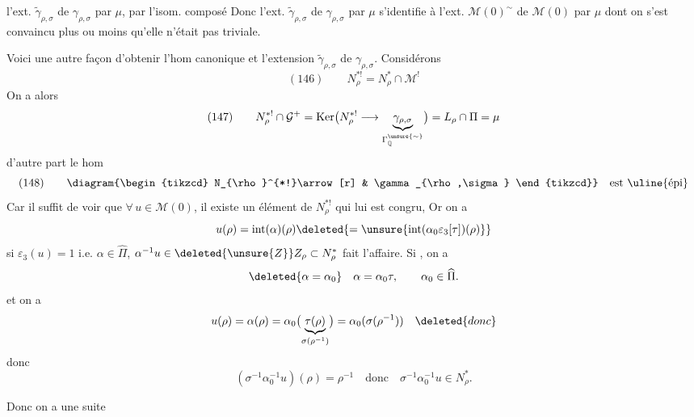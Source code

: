
l'ext. $\widetilde\gamma_{\rho,\sigma}$ de $\gamma_{\rho,\sigma}$ par $\mu$,
par l'isom. composé
Donc l'ext. $\widetilde\gamma_{\rho,\sigma}$ de $\gamma_{\rho,\sigma}$ par
$\mu$ s'identifie  à l'ext. $\mathcal M(0)^{\sim}$ de
$\mathcal M(0)$ par $\mu$ dont on s'est convaincu plus ou moins qu'elle
n'était pas triviale.

Voici une autre façon d'obtenir l'hom canonique
et l'extension $\widetilde\gamma_{\rho,\sigma}$ de $\gamma_{\rho,\sigma}$.
Considérons
\[
 (146)\qquad N_{\rho}^{*!}=N^*_{\rho}\cap\mathcal M^!
\]
On a alors
\[
 (147)\qquad
 N_{\rho}^{*!}\cap\mathcal G^+
 =\operatorname{Ker}\bigl(N_{\rho}^{*!}\longrightarrow
     \underbrace{\gamma_{\rho,\sigma}}_{\Gamma_{\mathbb Q}^{\unsure{\sim}}}\bigr)
 =L_{\rho}\cap\Pi=\mu
\]
d'autre part le hom
\[
 (148)\qquad
 \diagram{\begin{tikzcd}
 N_{\rho}^{*!}\arrow[r] & \gamma_{\rho,\sigma}
 \end{tikzcd}}
 \quad\text{est \uline{épi}}
\]
Car  il suffit de voir que 
$\forall\,u\in\mathcal M(0)$, il existe un élément de $N_{\rho}^{*!}$
qui lui est congru,  Or on a
\[
 u(\rho)=\operatorname{int}(\alpha)(\rho)
 \deleted{=\unsure{\operatorname{int}(\alpha_0\varepsilon_3[\tau])(\rho)}}
\]
si $\varepsilon_3(u)=1$ i.e. $\alpha\in\widehat\Pi$,
$\alpha^{-1}u\in\deleted{\unsure{Z}}Z_{\rho}\subset N^*_{\rho}$
fait l'affaire. Si 
, on a
\[
 \deleted{\alpha=\alpha_0}\quad\alpha=\alpha_0\tau,\qquad\alpha_0\in\widehat\Pi.
\]
et on a
\[
 u(\rho)=\alpha(\rho)=
 \alpha_0\bigl(\underbrace{\tau(\rho)}_{\sigma(\rho^{-1})}\bigr)
 =\alpha_0(\sigma(\rho^{-1}))\quad\deleted{donc}
\]
donc
\[
 (\sigma^{-1}\alpha_0^{-1}u)(\rho)=\rho^{-1}
 \quad\text{donc}\quad\sigma^{-1}\alpha_0^{-1}u\in N^*_{\rho}.
\]


Donc on a une suite 

